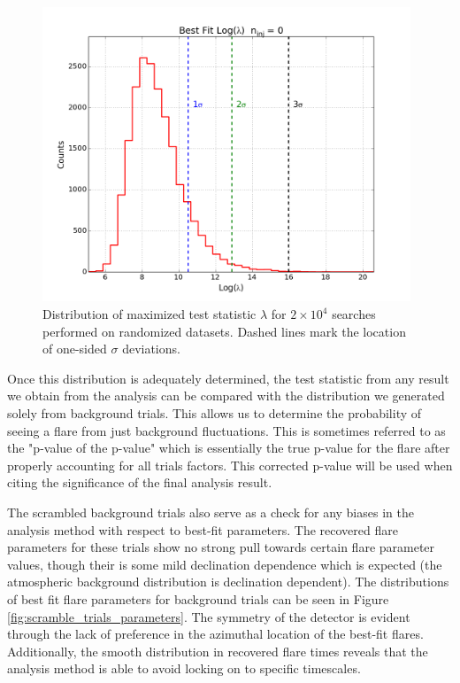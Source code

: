 \documentclass{gatech-thesis}
\begin{document}
\begin{figure}[ht]
  \begin{center}
    \includegraphics[width=0.98\textwidth,keepaspectratio]{TestStatisticDistribution_Null.png}
  \end{center}
  \caption{Distribution of maximized test statistic $\lambda$ for $2\times 10^4$ searches performed on randomized datasets. Dashed lines mark the location of one-sided $\sigma$ deviations.}
  \label{fig:NullScramblingDistribution}
\end{figure}

Once this distribution is adequately determined, the test statistic from any result we obtain from the analysis can be compared with the distribution we generated solely from background trials. This allows us to determine the probability of seeing a flare from just background fluctuations. This is sometimes referred to as the "p-value of the p-value" which is essentially the true p-value for the flare after properly accounting for all trials factors. This corrected p-value will be used when citing the significance of the final analysis result. 

The scrambled background trials also serve as a check for any biases in the analysis method with respect to best-fit parameters. The recovered flare parameters for these trials show no strong pull towards certain flare parameter values, though their is some mild declination dependence which is expected (the atmospheric background distribution is declination dependent). The distributions of best fit flare parameters for background trials can be seen in Figure \ref{fig:scramble_trials_parameters}. The symmetry of the detector is evident through the lack of preference in the azimuthal location of the best-fit flares. Additionally, the smooth distribution in recovered flare times reveals that the analysis method is able to avoid locking on to specific timescales.
\end{document}
